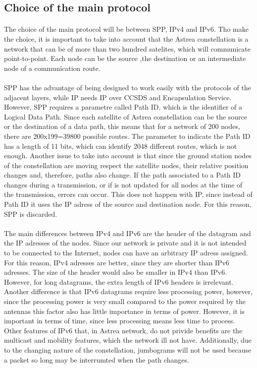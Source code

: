 \documentclass[12pt,a4paper]{report}
\begin{document}
\subsection{Choice of the main protocol}
\paragraph{}The choice of the main protocol will be between SPP, IPv4 and IPv6. Tho make the choice, it is important to take into account that the Astrea constellation is a network that can be of more than two hundred satelites, which will communicate point-to-point. Each node can be the source ,the destination or an intermediate node of a communication route.
\paragraph{}SPP has the advantage of being designed to work easily with the protocols of the adjacent layers, while IP needs IP over CCSDS and Encapsulation Service. However, SPP requires a parametre called Path ID, which is the identifier of a Logical Data Path. Since each satellite of Astrea constellation can be the source or the destination of a data path, this means that for a network of 200 nodes, there are 200x199=39800 possible routes. The parameter to indicate the Path ID has a length of 11 bits, which can identify 2048 different routes, which is not enough. Another issue to take into account is that since the ground station nodes of the constellation are moving respect the satellite nodes, their relative position changes and, therefore, paths also change. If the path associated to a Path ID changes during a transmission, or if is not updated for all nodes at the time of the transmission, errors can occur. This does not happen with IP, since instead of Path ID it uses the IP adress of the source and destination node. For this reason, SPP is discarded.
\paragraph{}The main differences between IPv4 and IPv6 are the header of the datagram and the IP adresses of the nodes. Since our  network is private and it is not intended to be connected to the Internet, nodes can have an arbitrary IP adress assigned. For this reason, IPv4 adresses are better, since they are shorter than IPv6 adresses. The size of the header would also be smaller in IPv4 than IPv6. However, for long datagrams, the extra length of IPv6 headers is irrelevant. Another difference is that IPv6 datagrams require less processing power, however, since the processing power is very small compared to the power required by the antennas this factor also has little importance in terms of power. However, it is important in terms of time, since less processing means less time to process. Other features of IPv6 that, in Astrea network, do not privide benefits are the multicast and mobility features, which the network ill not have. Additionally, due to the changing nature of the constellation, jumbograms will not be used because a packet so long may be interrumted when the path changes.
\end{document}
